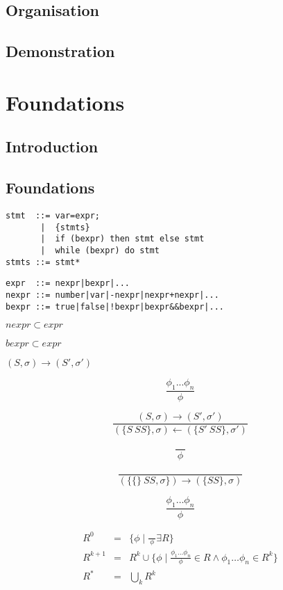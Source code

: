 \documentclass[12pt, a4paper]{book}
\begin{document}
  \section{Organisation}
  \label{sec:Organisation}
  \section{Demonstration}
  \label{sec:Demonstration}
  \chapter{Foundations}
  \label{chap:Foundations}
  \section{Introduction}
  \label{sec:Introduction}
  \section{Foundations}
  \label{sec:Foundations}

\begin{lstlisting}
stmt  ::= var=expr;
       |  {stmts}
       |  if (bexpr) then stmt else stmt
       |  while (bexpr) do stmt
stmts ::= stmt*
\end{lstlisting}

\begin{verbatim}
expr  ::= nexpr|bexpr|...
nexpr ::= number|var|-nexpr|nexpr+nexpr|...
bexpr ::= true|false|!bexpr|bexpr&&bexpr|...
\end{verbatim}

$nexpr \subset expr$

$bexpr \subset expr$

$(S,\sigma) \longrightarrow (S',\sigma')$

$$\frac{\phi_{1} ... \phi_{n}}{\phi}$$

$$
\frac{(S,\sigma) \longrightarrow (S', \sigma')}
{(\{S\ SS\},\sigma) \longleftarrow (\{S'\ SS\}, \sigma')}
$$

$$
\frac{}
{\ \phi \ }
$$

$$
\frac{}
{(\{ \{ \} \ SS, \sigma \}) \longrightarrow (\{ SS \}, \sigma)}
$$

$$
\frac{\phi_{1} \ldots \phi_{n}}
{\phi}
$$

\begin{eqnarray}
R^{0}   & = & \{\phi \mid \frac{}{\ \phi \ } \exists R\} \\
R^{k+1} & = & R^{k} \cup \{ \phi \mid \frac{\phi_{1} \ldots \phi_{n}}{\phi}
\in R \land \phi_{1}\ldots\phi_{n} \in R^{k} \} \\
R^{*}   & = & \bigcup_{k} R^{k}
\end{eqnarray}
\end{document}
